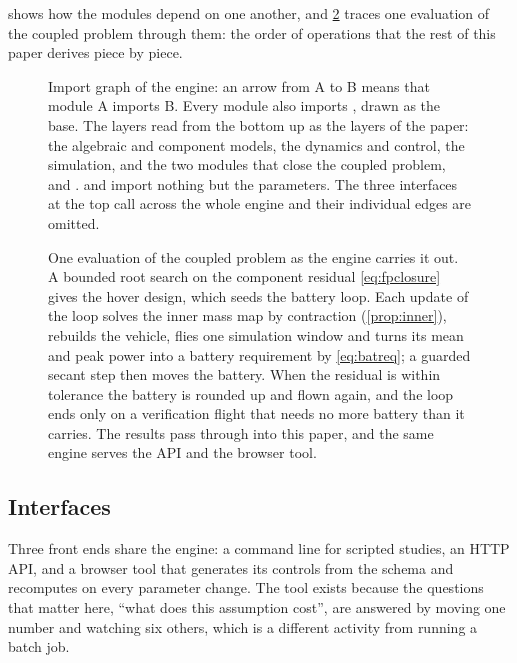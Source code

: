  shows how the modules depend on one another, and
\cref{fig:pipeline} traces one evaluation of the coupled problem through them:
the order of operations that the rest of this paper derives piece by piece.

\begin{figure}[tbp]
\centering

\caption{Import graph of the engine: an arrow from A to B means that module A
imports B. Every module also imports , drawn as the base. The
layers read from the bottom up as the layers of the paper: the algebraic and
component models, the dynamics and control, the simulation, and the two
modules that close the coupled problem,  and
.  and  import nothing
but the parameters. The three interfaces at the top call across the whole
engine and their individual edges are omitted.}
\label{fig:modules}
\end{figure}

\begin{figure}[tbp]
\centering

\caption{One evaluation of the coupled problem as the engine carries it out.
A bounded root search on the component residual \cref{eq:fpclosure} gives the
hover design, which seeds the battery loop. Each update of the loop solves the
inner mass map by contraction (\cref{prop:inner}), rebuilds the vehicle, flies
one simulation window and turns its mean and peak power into a battery
requirement by \cref{eq:batreq}; a guarded secant step then moves the battery.
When the residual is within tolerance the battery is rounded up and flown
again, and the loop ends only on a verification flight that needs no more
battery than it carries. The results pass through  into
this paper, and the same engine serves the API and the browser tool.}
\label{fig:pipeline}
\end{figure}

\subsection{Interfaces}

Three front ends share the engine: a command line for scripted studies, an HTTP
API, and a browser tool that generates its controls from the schema and
recomputes on every parameter change. The tool exists because the questions
that matter here, ``what does this assumption cost'', are answered by moving one
number and watching six others, which is a different activity from running a
batch job.

